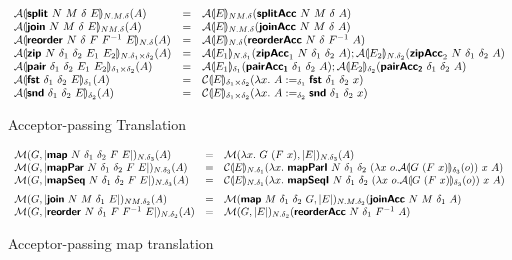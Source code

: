 \begin{figure}[H]
\begin{displaymath}
\begin{array}{lcl}
      \mathcal{A}\llparenthesis \bm{\mathsf{split}}~N~M~\delta~E \rrparenthesis_{N.M.\delta}(A)
      &=& \mathcal{A}\llparenthesis E \rrparenthesis_{NM.\delta}(\bm{\mathsf{splitAcc}}~N~M~\delta~A)
      \\
      \mathcal{A}\llparenthesis \bm{\mathsf{join}}~N~M~\delta~E \rrparenthesis_{NM.\delta}(A)
      &=& \mathcal{A}\llparenthesis E \rrparenthesis_{N.M.\delta}(\bm{\mathsf{joinAcc}}~N~M~\delta~A)
      \\
      \mathcal{A}\llparenthesis \bm{\mathsf{reorder}}~N~\delta~F~F^{-1}~E \rrparenthesis_{N.\delta}(A)
      &=& \mathcal{A}\llparenthesis E \rrparenthesis_{N.\delta}(\bm{\mathsf{reorderAcc}}~N~\delta~F^{-1}~A)
      \\
      \mathcal{A}\llparenthesis \bm{\mathsf{zip}}~N~\delta_1~\delta_2~E_1~E_2 \rrparenthesis_{N.\delta_1\times\delta_2}(A)
      &=& \mathcal{A}\llparenthesis E_1 \rrparenthesis_{N.\delta_1}(\bm{\mathsf{zipAcc}}_1~N~\delta_1~\delta_2~A);
          \mathcal{A}\llparenthesis E_2 \rrparenthesis_{N.\delta_2}(\bm{\mathsf{zipAcc}}_2~N~\delta_1~\delta_2~A)
      \\
      \mathcal{A}\llparenthesis \bm{\mathsf{pair}}~\delta_1~\delta_2~E_1~E_2 \rrparenthesis_{\delta_1\times\delta_2}(A)
      &=& \mathcal{A}\llparenthesis E_1 \rrparenthesis_{\delta_1}(\bm{\mathsf{pairAcc_1}}~\delta_1~\delta_2~A);
          \mathcal{A}\llparenthesis E_2 \rrparenthesis_{\delta_2}(\bm{\mathsf{pairAcc_2}}~\delta_1~\delta_2~A)
      \\
      \mathcal{A}\llparenthesis \bm{\mathsf{fst}}~{\delta_1}~{\delta_2}~E \rrparenthesis_{\delta_1}(A)
      &=& \mathcal{C}\llparenthesis E \rrparenthesis_{\delta_1\times\delta_2}(\lambda x.~A :=_{\delta_1} \bm{\mathsf{fst}}~{\delta_1}~{\delta_2}~x)
      \\
      \mathcal{A}\llparenthesis \bm{\mathsf{snd}}~{\delta_1}~{\delta_2}~E \rrparenthesis_{\delta_2}(A)
      &=& \mathcal{C}\llparenthesis E \rrparenthesis_{\delta_1\times\delta_2}(\lambda x.~A :=_{\delta_2} \bm{\mathsf{snd}}~{\delta_1}~{\delta_2}~x)
    \end{array}
  \end{displaymath}
  \caption{Acceptor-passing Translation}\label{fig:acc-trans}
\end{figure}

\begin{figure}[H]
  \begin{displaymath}
    \begin{array}{lcl}
      \semM{G}{\prim{map}~N~\delta_1~\delta_2~F~E}_{N.\delta_3}(A)
      &=& \semM{\lambda x.~G~(F~x)}{E}_{N.\delta_3}(A) %
      \\
      \semM{G}{\prim{mapPar}~N~\delta_1~\delta_2~F~E}_{N.\delta_3}(A)
      &=& \semE{E}_{N.\delta_1}(\lambda x.~\prim{mapParI}~N~\delta_1~\delta_2~(\lambda x~o. \semA{G~(F~x)}_{\delta_3}(o))~x~A)
      \\
      \semM{G}{\prim{mapSeq}~N~\delta_1~\delta_2~F~E}_{N.\delta_3}(A)
      &=& \semE{E}_{N.\delta_1}(\lambda x.~\prim{mapSeqI}~N~\delta_1~\delta_2~(\lambda x~o. \semA{G~(F~x)}_{\delta_3}(o))~x~A)
      \medskip\\

      \semM{G}{\prim{join}~N~M~\delta_1~E}_{NM.\delta_2}(A)
      &=& \semM{\prim{map}~M~\delta_1~\delta_2~G}{E}_{N.M.\delta_2}(\prim{joinAcc}~N~M~\delta_1~A)
      \\
      \semM{G}{\prim{reorder}~N~\delta_1~F~F^{-1}~E}_{N.\delta_2}(A)
      &=& \semM{G}{E}_{N.\delta_2}(\prim{reorderAcc}~N~\delta_1~F^{-1}~A)
      \\
    \end{array}
  \end{displaymath}
  \caption{Acceptor-passing map translation}\label{fig:map-acc-trans}
\end{figure}

